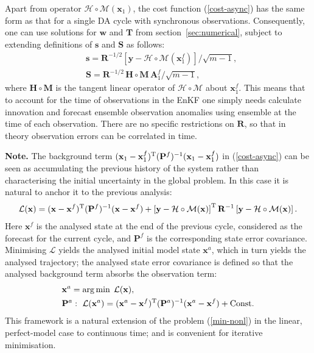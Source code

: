 \documentclass[11pt]{report}
\newcommand{\mb} {\mathbf}
\newcommand{\T}{^{\tiny \mathrm T}}
\begin{document}
Apart from operator $\mathcal H \circ \mathcal M (\mb x_1)$, the cost function (\ref{cost-async}) has the same form as that for a single DA cycle with synchronous observations.
Consequently, one can use solutions for $\mb w$ and $\mb T$ from section~\ref{sec:numerical}, subject to extending definitions of $\mb s$ and $\mb S$ as follows:
\begin{align}
  \label{s-async}
  &\mb s = \mb R^{-1/2} \left[ \mb y - \mathcal H \circ \mathcal M (\mb x_1^f) \right] / \sqrt{m - 1},\\
  \label{S-async}
  &\mb S = \mb R^{-1/2} \, \mb H \circ \mb M \, \mb A_1^f / \sqrt{m - 1},
\end{align}
where $\mb H \circ \mb M$ is the tangent linear operator of $\mathcal H \circ \mathcal M$ about $\mb x_1^f$.
This means that to account for the time of observations in the EnKF one simply needs calculate innovation and forecast ensemble observation anomalies using ensemble at the time of each observation.
There are no specific restrictions on $\mb R$, so that in theory observation errors can be correlated in time.

{
  \setlength{\abovedisplayskip}{2pt}
  \setlength{\belowdisplayskip}{2pt}
  \scriptsize
  {\bf Note.} The background term $(\mb x_1 - \mb x_1^f)\T (\mb P^f)^{-1} (\mb x_1 - \mb x_1^f)$ in (\ref{cost-async}) can be seen as accumulating the previous history of the system rather than characterising the initial uncertainty in the global problem.
  In this case it is natural to anchor it to the previous analysis:
  \begin{align}
    \mathcal L(\mb x) = (\mb x - \mb x^f)\T (\mb P^f)^{-1} (\mb x - \mb x^f) + \left [ \mb y - \mathcal H \circ \mathcal M(\mb x) \right ] \T \mb R^{-1} \left [ \mb y - \mathcal H \circ \mathcal M(\mb x) \right ].
  \end{align}
  Here $\mb x^f$ is the analysed state at the end of the previous cycle, considered as the forecast for the current cycle, and $\mb P^f$ is the corresponding state error covariance.
  Minimising $\mathcal L$ yields the analysed initial model state $\mb x^a$, which in turn yields the analysed trajectory; the analysed state error covariance is defined so that the analysed background term absorbs the observation term:
  \begin{align*}
    &\mb x^a = \arg \min \; \mathcal L(\mb x),\\
    &\mb P^a: \ \mathcal L(\mb x^a) = (\mb x^a - \mb x^f)\T (\mb P^a)^{-1} (\mb x^a - \mb x^f) + \mathrm{Const}.
  \end{align*}
  This framework is a natural extension of the problem (\ref{min-nonl}) in the linear, perfect-model case to continuous time; and is convenient for iterative minimisation.\par
}
\end{document}
